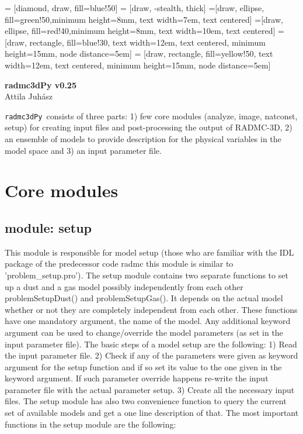 \documentclass[12pt]{article}
\newcommand{\pymod}{{\tt  radmc3dPy }}
\begin{document}
 = [diamond, draw, fill=blue!50]
 = [draw, -stealth, thick]
=[draw, ellipse, fill=green!50,minimum height=8mm, text width=7em, text centered]
=[draw, ellipse, fill=red!40,minimum height=8mm, text width=10em, text centered]
 = [draw, rectangle, fill=blue!30, text width=12em, text centered, minimum height=15mm, node distance=5em]
 = [draw, rectangle, fill=yellow!50, text width=12em, text centered, minimum height=15mm, node distance=5em]



\begin{center}
{\huge\bf radmc3dPy v0.25}\\
\vspace{0.5cm}
{\large Attila Juh\'asz}
\end{center}

\pymod consists of three parts: 1) few core modules (analyze, image, natconst, setup) for creating input files and post-processing
the output of RADMC-3D, 2) an ensemble of models to provide description for the physical variables in the model space and 
3) an input parameter file. 

\section{Core modules}
\label{sec:core}

\subsection{module: setup}
\label{subsec:setup}

This module is responsible for model setup (those who are familiar with the IDL package of the predecessor code radmc this
module is similar to 'problem\_setup.pro'). The setup module contains two separate functions to set up a dust and a gas model
possibly independently from each other problemSetupDust() and problemSetupGas(). It depends on the actual model whether 
or not they are completely independent from each other. These functions have one mandatory  argument, the name of the model. Any
additional keyword argument can be used to change/override the model parameters (as set in the input parameter file). The basic 
steps of a model setup are the 
following: 1) Read the input parameter file. 2) Check if any of the parameters were given as
keyword argument for the setup function and if so set its value to the one given in the keyword argument. If such parameter
override happens re-write the input parameter file with the actual parameter setup. 3) Create all the necessary input files.
The setup module has also two convenience function to query the current set of available models and get a one line
description of that. The most important functions in the setup module are the following:
\end{document}
